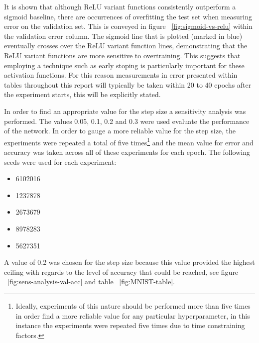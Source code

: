 \documentclass{article}
\begin{document}
It is shown that although ReLU variant functions consistently outperform a sigmoid baseline, there are occurrences of overfitting the test set when measuring error on the validation set. This is conveyed in figure ~\ref{fig:sigmoid-vs-relu} within the validation error column. The sigmoid line that is plotted (marked in blue) eventually crosses over the ReLU variant function lines, demonstrating that the ReLU variant functions are more sensitive to overtraining. This suggests that employing a technique such as early stoping is particularly important for these activation functions. For this reason measurements in error presented within tables throughout this report will typically be taken within 20 to 40 epochs after the experiment starts, this will be explicitly stated.

In order to find an appropriate value for the step size a sensitivity analysis was performed. The values 0.05, 0.1, 0.2 and 0.3 were used evaluate the performance of the network. In order to gauge a more reliable value for the step size, the experiments were repeated a total of five times\footnote{Ideally, experiments of this nature should be performed more than five times in order find a more reliable value for any particular hyperparameter, in this instance the experiments were repeated five times due to time constraining factors.} and the mean value for error and accuracy was taken across all of these experiments for each epoch. The following seeds were used for each experiment:

\begin{itemize}
  \item 6102016
  \item 1237878
  \item 2673679
  \item 8978283
  \item 5627351
\end{itemize}

A value of 0.2 was chosen for the step size because this value provided the highest ceiling with regards to the level of accuracy that could be reached, see figure ~\ref{fig:sens-analysis-val-acc} and table ~\ref{fig:MNIST-table}.
\end{document}
